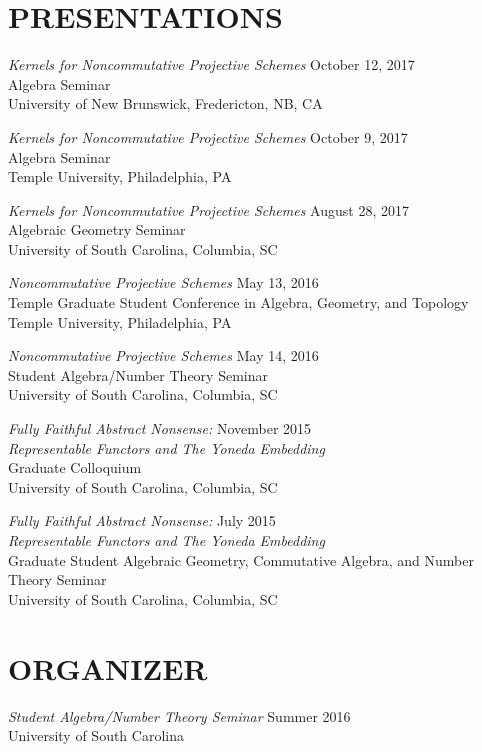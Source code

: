 \documentclass[line,overlapped]{res}
\begin{document}
\begin{resume}
  \section{PRESENTATIONS}
  \textsl{Kernels for Noncommutative Projective Schemes} \hfill October 12, 2017\\
  Algebra Seminar\\
  University of New Brunswick, Fredericton, NB, CA
  
  \textsl{Kernels for Noncommutative Projective Schemes} \hfill October 9, 2017\\
  Algebra Seminar\\
  Temple University, Philadelphia, PA
  
  \textsl{Kernels for Noncommutative Projective Schemes} \hfill August 28, 2017\\
  Algebraic Geometry Seminar\\
  University of South Carolina, Columbia, SC
  
  \textsl{Noncommutative Projective Schemes} \hfill May 13, 2016\\
  Temple Graduate Student Conference in Algebra, Geometry, and Topology\\
  Temple University, Philadelphia, PA

  \textsl{Noncommutative Projective Schemes} \hfill May 14, 2016\\
  Student Algebra/Number Theory Seminar\\
  University of South Carolina, Columbia, SC

  \textsl{Fully Faithful Abstract Nonsense:} \hfill November 2015\\
  \textsl{Representable Functors and The Yoneda Embedding}\\
  Graduate Colloquium\\
  University of South Carolina, Columbia, SC

  \textsl{Fully Faithful Abstract Nonsense:} \hfill July 2015\\
  \textsl{Representable Functors and The Yoneda Embedding}\\
  Graduate Student Algebraic Geometry, Commutative Algebra, and Number Theory Seminar\\
  University of South Carolina, Columbia, SC

  \section{ORGANIZER}
  \textsl{Student Algebra/Number Theory Seminar} \hfill Summer 2016\\
  University of South Carolina
  

\end{resume}
\end{document}

